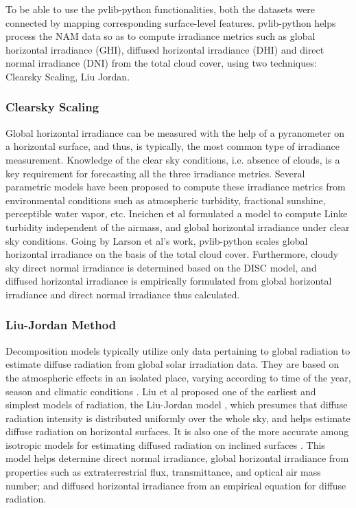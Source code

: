 \par To be able to use the pvlib-python functionalities, both the datasets were connected by mapping corresponding surface-level features. pvlib-python helps process the NAM data so as to compute irradiance metrics such as global horizontal irradiance (GHI), diffused horizontal irradiance (DHI) and direct normal irradiance (DNI) from the total cloud cover, using two techniques: Clearsky Scaling, Liu Jordan.


\subsubsection*{Clearsky Scaling}
Global horizontal irradiance can be measured with the help of a pyranometer on a horizontal surface, and thus, is typically, the most common type of irradiance measurement. Knowledge of the clear sky conditions, i.e. absence of clouds, is a key requirement for forecasting all the three irradiance metrics. Several parametric models have been proposed to compute these irradiance metrics from environmental conditions such as atmospheric turbidity, fractional sunshine, perceptible water vapor, etc. Ineichen et al \cite{pvlib_ineichen} formulated a model to compute Linke turbidity independent of the airmass, and global horizontal irradiance under clear sky conditions. Going by Larson et al's \cite{pvlib_larson} work, pvlib-python scales global horizontal irradiance on the basis of the total cloud cover. Furthermore, cloudy sky direct normal irradiance is determined based on the DISC \cite{pvlib_disc} model, and diffused horizontal irradiance is empirically formulated from global horizontal irradiance and direct normal irradiance thus calculated.

\subsubsection*{Liu-Jordan Method}
Decomposition models typically utilize only data pertaining to global radiation to estimate diffuse radiation from global solar irradiation data. They are based on the atmospheric effects in an isolated place, varying according to time of the year, season and climatic conditions \cite{pvlib_liujordan}. Liu et al proposed one of the earliest and simplest models of radiation, the Liu-Jordan model \cite{pvlib_liujordan2}, which presumes that diffuse radiation intensity is distributed uniformly over the whole sky, and helps estimate diffuse radiation on horizontal surfaces. It is also one of the more accurate among isotropic models for estimating diffused radiation on inclined surfaces \cite{pvlib_liujordan3}. This model helps determine direct normal irradiance, global horizontal irradiance from properties such as extraterrestrial flux, transmittance, and optical air mass number; and diffused horizontal irradiance from an empirical equation for diffuse radiation.

